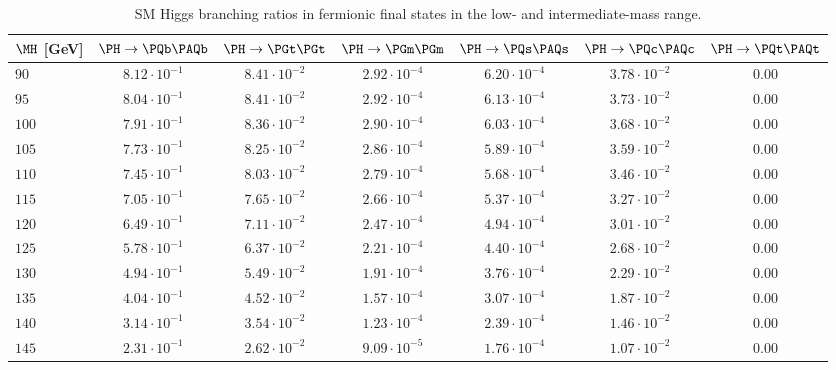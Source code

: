 \begin{table}
  \vspace{-\headsep}
  \caption{SM Higgs branching ratios in fermionic final states in the low-
  and intermediate-mass range.}
  \label{tab:BR-lm.part1}
  \centering
  \small
  \begin{tabular}{lcccccc}\hline
$\MH$ [GeV] & $\PH \rightarrow \PQb\PAQb$ & $\PH \rightarrow \PGt \PGt$ & $\PH \rightarrow
\PGm \PGm$ & $\PH \rightarrow \PQs \PAQs$ & $\PH \rightarrow \PQc \PAQc$
& $\PH \rightarrow \PQt \PAQt$ \\
\hline
$90 $&$ 8.12\cdot 10^{-1}  $&$ 8.41\cdot 10^{-2}  $&$ 2.92\cdot 10^{-4}  $&$ 6.20\cdot 10^{-4}  $&$ 3.78\cdot 10^{-2}  $&$ 0.00 $\\
$95 $&$ 8.04\cdot 10^{-1}  $&$ 8.41\cdot 10^{-2}  $&$ 2.92\cdot 10^{-4}  $&$ 6.13\cdot 10^{-4}  $&$ 3.73\cdot 10^{-2}  $&$ 0.00 $\\
$100 $&$ 7.91\cdot 10^{-1}  $&$ 8.36\cdot 10^{-2}  $&$ 2.90\cdot 10^{-4}  $&$ 6.03\cdot 10^{-4}  $&$ 3.68\cdot 10^{-2}  $&$ 0.00 $\\
$105 $&$ 7.73\cdot 10^{-1}  $&$ 8.25\cdot 10^{-2}  $&$ 2.86\cdot 10^{-4}  $&$ 5.89\cdot 10^{-4}  $&$ 3.59\cdot 10^{-2}  $&$ 0.00 $\\
$110 $&$ 7.45\cdot 10^{-1}  $&$ 8.03\cdot 10^{-2}  $&$ 2.79\cdot 10^{-4}  $&$ 5.68\cdot 10^{-4}  $&$ 3.46\cdot 10^{-2}  $&$ 0.00 $\\
$115 $&$ 7.05\cdot 10^{-1}  $&$ 7.65\cdot 10^{-2}  $&$ 2.66\cdot 10^{-4}  $&$ 5.37\cdot 10^{-4}  $&$ 3.27\cdot 10^{-2}  $&$ 0.00 $\\
$120 $&$ 6.49\cdot 10^{-1}  $&$ 7.11\cdot 10^{-2}  $&$ 2.47\cdot 10^{-4}  $&$ 4.94\cdot 10^{-4}  $&$ 3.01\cdot 10^{-2}  $&$ 0.00 $\\
$125 $&$ 5.78\cdot 10^{-1}  $&$ 6.37\cdot 10^{-2}  $&$ 2.21\cdot 10^{-4}  $&$ 4.40\cdot 10^{-4}  $&$ 2.68\cdot 10^{-2}  $&$ 0.00 $\\
$130 $&$ 4.94\cdot 10^{-1}  $&$ 5.49\cdot 10^{-2}  $&$ 1.91\cdot 10^{-4}  $&$ 3.76\cdot 10^{-4}  $&$ 2.29\cdot 10^{-2}  $&$ 0.00 $\\
$135 $&$ 4.04\cdot 10^{-1}  $&$ 4.52\cdot 10^{-2}  $&$ 1.57\cdot 10^{-4}  $&$ 3.07\cdot 10^{-4}  $&$ 1.87\cdot 10^{-2}  $&$ 0.00 $\\
$140 $&$ 3.14\cdot 10^{-1}  $&$ 3.54\cdot 10^{-2}  $&$ 1.23\cdot 10^{-4}  $&$ 2.39\cdot 10^{-4}  $&$ 1.46\cdot 10^{-2}  $&$ 0.00 $\\
$145 $&$ 2.31\cdot 10^{-1}  $&$ 2.62\cdot 10^{-2}  $&$ 9.09\cdot 10^{-5}  $&$ 1.76\cdot 10^{-4}  $&$ 1.07\cdot 10^{-2}  $&$ 0.00 $\\

\end{tabular}
\end{table}
